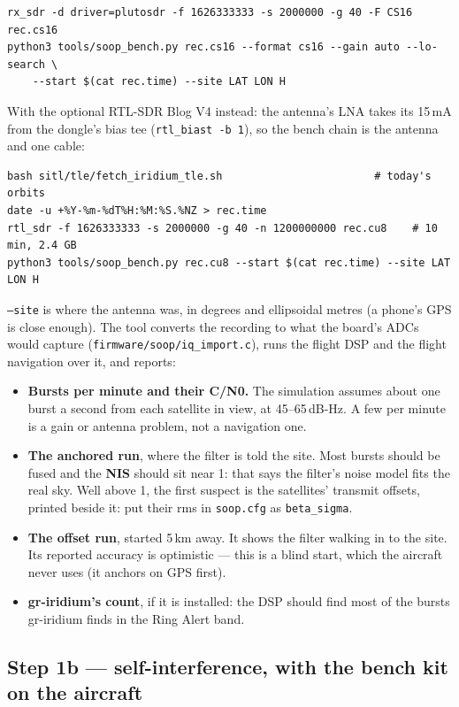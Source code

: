 \documentclass[11pt,a4paper]{article}
\newcommand{\file}[1]{\texttt{\small #1}}
\newcommand{\cmd}[1]{\texttt{\small #1}}
\begin{document}
\begin{verbatim}
rx_sdr -d driver=plutosdr -f 1626333333 -s 2000000 -g 40 -F CS16 rec.cs16
python3 tools/soop_bench.py rec.cs16 --format cs16 --gain auto --lo-search \
    --start $(cat rec.time) --site LAT LON H
\end{verbatim}

With the optional RTL-SDR Blog V4 instead: the antenna's LNA takes its 15\,mA from the
dongle's bias tee (\cmd{rtl\_biast -b 1}), so the bench chain is the antenna and one cable:

\begin{verbatim}
bash sitl/tle/fetch_iridium_tle.sh                        # today's orbits
date -u +%Y-%m-%dT%H:%M:%S.%NZ > rec.time
rtl_sdr -f 1626333333 -s 2000000 -g 40 -n 1200000000 rec.cu8    # 10 min, 2.4 GB
python3 tools/soop_bench.py rec.cu8 --start $(cat rec.time) --site LAT LON H
\end{verbatim}

\file{--site} is where the antenna was, in degrees and ellipsoidal metres (a phone's GPS is
close enough). The tool converts the recording to what the board's ADCs would capture
(\file{firmware/soop/iq\_import.c}), runs the flight DSP and the flight navigation over it,
and reports:

\begin{itemize}
\item \textbf{Bursts per minute and their C/N0.} The simulation assumes about one burst a
second from each satellite in view, at 45--65\,dB-Hz. A few per minute is a gain or antenna
problem, not a navigation one.
\item \textbf{The anchored run}, where the filter is told the site. Most bursts should be
fused and the \textbf{NIS} should sit near 1: that says the filter's noise model fits the
real sky. Well above 1, the first suspect is the satellites' transmit offsets, printed
beside it: put their rms in \file{soop.cfg} as \file{beta\_sigma}.
\item \textbf{The offset run}, started 5\,km away. It shows the filter walking in to the
site. Its reported accuracy is optimistic --- this is a blind start, which the aircraft
never uses (it anchors on GPS first).
\item \textbf{gr-iridium's count}, if it is installed: the DSP should find most of the
bursts gr-iridium finds in the Ring Alert band.
\end{itemize}

\subsection{Step 1b --- self-interference, with the bench kit on the aircraft}
\end{document}
